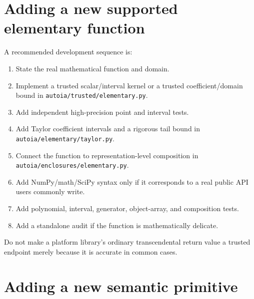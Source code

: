 \documentclass[11pt]{article}
\newcommand{\codepath}[1]{\nolinkurl{#1}}
\begin{document}
\section{Adding a new supported elementary function}

A recommended development sequence is:
\begin{enumerate}[leftmargin=*]
\item State the real mathematical function and domain.
\item Implement a trusted scalar/interval kernel or a trusted coefficient/domain
bound in \codepath{autoia/trusted/elementary.py}.
\item Add independent high-precision point and interval tests.
\item Add Taylor coefficient intervals and a rigorous tail bound in
\codepath{autoia/elementary/taylor.py}.
\item Connect the function to representation-level composition in
\codepath{autoia/enclosures/elementary.py}.
\item Add NumPy/math/SciPy syntax only if it corresponds to a real public API
users commonly write.
\item Add polynomial, interval, generator, object-array, and composition tests.
\item Add a standalone audit if the function is mathematically delicate.
\end{enumerate}

Do not make a platform library's ordinary transcendental return value a trusted
endpoint merely because it is accurate in common cases.

\section{Adding a new semantic primitive}
\end{document}
